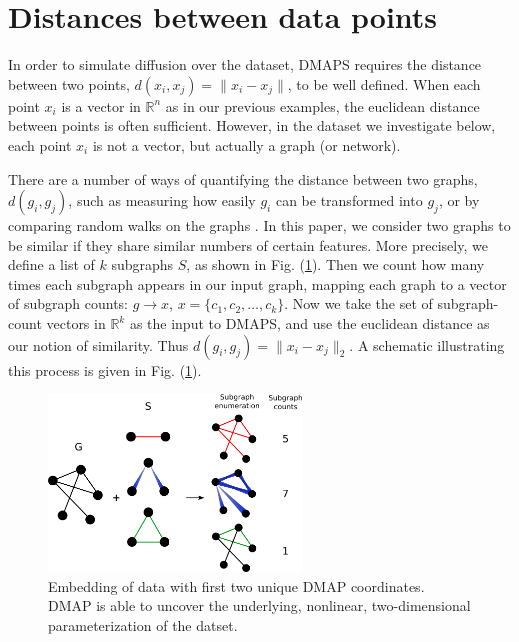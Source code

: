 \documentclass[11pt]{article}
\begin{document}
\clearpage


\section{Distances between data points}
In order to simulate diffusion over the dataset, DMAPS requires the distance between two points, $d(x_i, x_j) = \| x_i - x_j \|$, to be well defined. When each point $x_i$ is a vector in $\mathbb{R}^n$ as in our previous examples, the euclidean distance between points is often sufficient. However, in the dataset we investigate below, each point $x_i$ is not a vector, but actually a graph (or network).

There are a number of ways of quantifying the distance between two graphs, $d(g_i, g_j)$, such as measuring how easily $g_i$ can be transformed into $g_j$, or by comparing random walks on the graphs \cite{edit_dist} \cite{graph_kernels}. In this paper, we consider two graphs to be similar if they share similar numbers of certain features. More precisely, we define a list of $k$ subgraphs $S$, as shown in Fig. (\ref{fig:subgraph_counting}). Then we count how many times each subgraph appears in our input graph, mapping each graph to a vector of subgraph counts: $g \rightarrow x$, $x = \{c_1, c_2, \ldots, c_k\}$. Now we take the set of subgraph-count vectors in $\mathbb{R}^k$ as the input to DMAPS, and use the euclidean distance as our notion of similarity. Thus $d(g_i, g_j) = \| x_i - x_j \|_2$. A schematic illustrating this process is given in Fig. (\ref{fig:subgraph_counting}).

\begin{figure}[!h]
  \begin{center}
    \includegraphics[width=0.6\textwidth]{subgraph_counting}
    \caption{Embedding of data with first two unique DMAP coordinates. DMAP is able to uncover the underlying, nonlinear, two-dimensional parameterization of the datset.}
  \end{center}
  \label{fig:subgraph_counting}
\end{figure}
\end{document}
